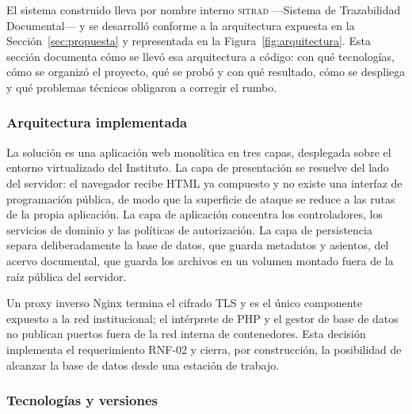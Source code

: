 El sistema construido lleva por nombre interno \textsc{sitrad} —Sistema de Trazabilidad Documental— y se desarrolló conforme a la arquitectura expuesta en la Sección~\ref{sec:propuesta} y representada en la Figura~\ref{fig:arquitectura}. Esta sección documenta cómo se llevó esa arquitectura a código: con qué tecnologías, cómo se organizó el proyecto, qué se probó y con qué resultado, cómo se despliega y qué problemas técnicos obligaron a corregir el rumbo.

\subsubsection*{Arquitectura implementada}

La solución es una aplicación web monolítica en tres capas, desplegada sobre el entorno virtualizado del Instituto. La capa de presentación se resuelve del lado del servidor: el navegador recibe HTML ya compuesto y no existe una interfaz de programación pública, de modo que la superficie de ataque se reduce a las rutas de la propia aplicación. La capa de aplicación concentra los controladores, los servicios de dominio y las políticas de autorización. La capa de persistencia separa deliberadamente la base de datos, que guarda metadatos y asientos, del acervo documental, que guarda los archivos en un volumen montado fuera de la raíz pública del servidor.

Un proxy inverso Nginx termina el cifrado TLS y es el único componente expuesto a la red institucional; el intérprete de PHP y el gestor de base de datos no publican puertos fuera de la red interna de contenedores. Esta decisión implementa el requerimiento RNF-02 y cierra, por construcción, la posibilidad de alcanzar la base de datos desde una estación de trabajo.

\subsubsection*{Tecnologías y versiones}

